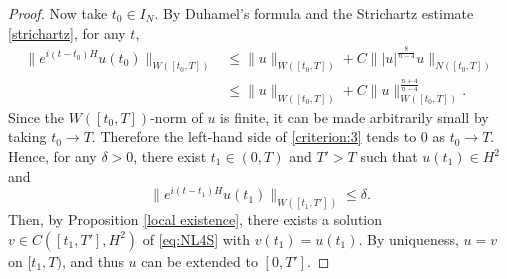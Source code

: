 \documentclass[10pt,a4paper]{amsart}
\begin{document}
\begin{proof}
Now take $t_{0} \in I_{N}$. By Duhamel's formula and the Strichartz estimate \eqref{strichartz}, for any $t$,
\begin{equation}\label{criterion:3}
\begin{aligned}
\|e^{i(t-t_{0})H}u(t_{0})\|_{W([t_{0}, T])}
&\leq \|u\|_{W([t_{0}, T])} + C\||u|^{\frac{8}{n-4}}u\|_{N([t_{0}, T])} \\
&\leq \|u\|_{W([t_{0}, T])} + C\|u\|_{W([t_{0}, T])}^{\frac{n+4}{n-4}}.
\end{aligned}
\end{equation}
Since the $W([t_{0}, T])$-norm of $u$ is finite, it can be made arbitrarily small by taking $t_{0}\to T$.
Therefore the left-hand side of \eqref{criterion:3} tends to $0$ as $t_{0}\to T$.
Hence, for any $\delta > 0$, there exist $t_{1} \in (0, T)$ and $T' > T$ such that $u(t_{1}) \in H^{2}$ and
\begin{equation}\label{criterion:4}
\|e^{i(t-t_{1})H}u(t_{1})\|_{W([t_{1}, T'])} \leq \delta.
\end{equation}
Then, by Proposition \ref{local existence}, there exists a solution $v \in C([t_{1}, T'], H^{2})$ of \eqref{eq:NL4S} with $v(t_{1}) = u(t_{1})$.
By uniqueness, $u = v$ on $[t_{1}, T)$, and thus $u$ can be extended to $[0, T']$.
\end{proof}
\end{document}
